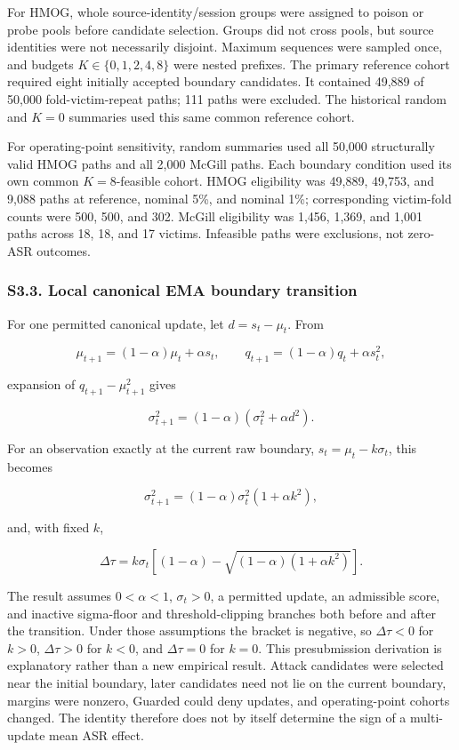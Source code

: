 \documentclass[technologies,supfile,submit,moreauthors]{Definitions/mdpi}
\begin{document}
For HMOG, whole source-identity/session groups were assigned to poison or probe pools before candidate selection. Groups did not cross pools, but source identities were not necessarily disjoint. Maximum sequences were sampled once, and budgets \(K\in\{0,1,2,4,8\}\) were nested prefixes. The primary reference cohort required eight initially accepted boundary candidates. It contained 49,889 of 50,000 fold-victim-repeat paths; 111 paths were excluded. The historical random and \(K=0\) summaries used this same common reference cohort.

For operating-point sensitivity, random summaries used all 50,000 structurally valid HMOG paths and all 2,000 McGill paths. Each boundary condition used its own common \(K=8\)-feasible cohort. HMOG eligibility was 49,889, 49,753, and 9,088 paths at reference, nominal 5\%, and nominal 1\%; corresponding victim-fold counts were 500, 500, and 302. McGill eligibility was 1,456, 1,369, and 1,001 paths across 18, 18, and 17 victims. Infeasible paths were exclusions, not zero-ASR outcomes.

\subsubsection*{S3.3. Local canonical EMA boundary transition}\label{sm:s3-3}

For one permitted canonical update, let \(d=s_t-\mu_t\). From

\[
\mu_{t+1}=(1-\alpha)\mu_t+\alpha s_t,
\qquad
q_{t+1}=(1-\alpha)q_t+\alpha s_t^2,
\]

expansion of \(q_{t+1}-\mu_{t+1}^2\) gives

\[
\sigma_{t+1}^2=(1-\alpha)\left(\sigma_t^2+\alpha d^2\right).
\]

For an observation exactly at the current raw boundary, \(s_t=\mu_t-k\sigma_t\), this becomes

\[
\sigma_{t+1}^2=(1-\alpha)\sigma_t^2(1+\alpha k^2),
\]

and, with fixed \(k\),

\[
\Delta\tau
=k\sigma_t\left[(1-\alpha)-\sqrt{(1-\alpha)(1+\alpha k^2)}\right].
\]

The result assumes \(0<\alpha<1\), \(\sigma_t>0\), a permitted update, an admissible score, and inactive sigma-floor and threshold-clipping branches both before and after the transition. Under those assumptions the bracket is negative, so \(\Delta\tau<0\) for \(k>0\), \(\Delta\tau>0\) for \(k<0\), and \(\Delta\tau=0\) for \(k=0\). This presubmission derivation is explanatory rather than a new empirical result. Attack candidates were selected near the initial boundary, later candidates need not lie on the current boundary, margins were nonzero, Guarded could deny updates, and operating-point cohorts changed. The identity therefore does not by itself determine the sign of a multi-update mean ASR effect.
\end{document}

